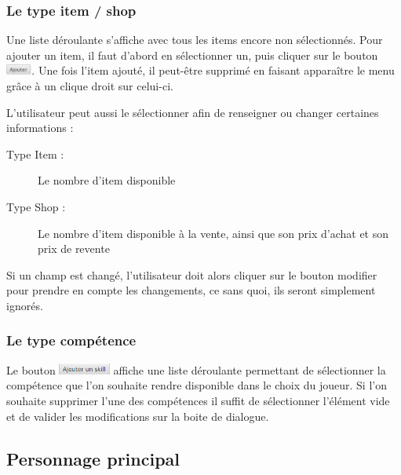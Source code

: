 			\subsubsection{Le type item / shop}
				\label{subsubsec:item_shop}

				Une liste déroulante s'affiche avec tous les items encore non sélectionnés. Pour ajouter un item, il faut d'abord en sélectionner un, puis cliquer sur le bouton \includegraphics[height=10pt, keepaspectratio]{img/ajouterBouton.png}. Une fois l'item ajouté, il peut-être supprimé en faisant apparaître le menu grâce à un clique droit sur celui-ci.

				L'utilisateur peut aussi le sélectionner afin de renseigner ou changer certaines informations :

				\begin{description}
					\item[Type Item :] Le nombre d'item disponible
					\item[Type Shop :] Le nombre d'item disponible à la vente, ainsi que son prix d'achat et son prix de revente
				\end{description}

				Si un champ est changé, l'utilisateur doit alors cliquer sur le bouton modifier pour prendre en compte les changements, ce sans quoi, ils seront simplement ignorés.

			\subsubsection{Le type compétence}
				 \label{subsubsec:persoCreationSkill}

				Le bouton \includegraphics[height=10pt, keepaspectratio]{img/preludeAjouterSkillBouton.png} affiche une liste déroulante permettant de sélectionner la compétence que l'on souhaite rendre disponible dans le choix du joueur. Si l'on souhaite supprimer l'une des compétences il suffit de sélectionner l'élément vide et de valider les modifications sur la boite de dialogue.

		\subsection{Personnage principal}
			\label{subsec:main_character}

